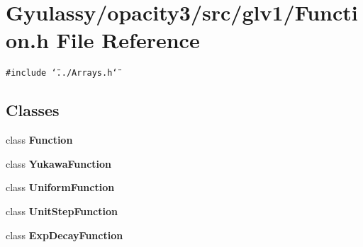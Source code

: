 \section{Gyulassy/opacity3/src/glv1/Function.h File Reference}
\label{Function_8h}
{\tt \#include \char`\"{}../Arrays.h\char`\"{}}\par
\subsection*{Classes}
\begin{CompactItemize}
\item 
class {\bf Function}
\item 
class {\bf YukawaFunction}
\item 
class {\bf UniformFunction}
\item 
class {\bf UnitStepFunction}
\item 
class {\bf ExpDecayFunction}
\end{CompactItemize}
